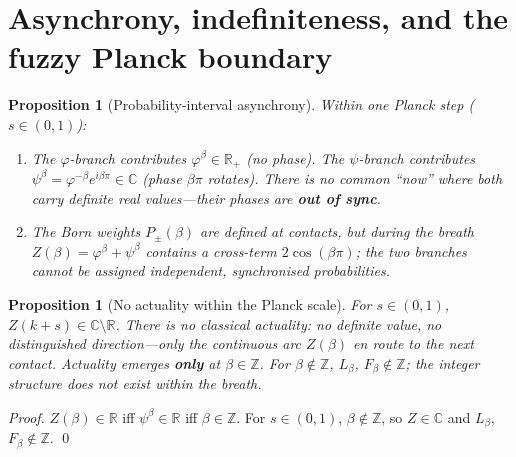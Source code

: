 \documentclass[12pt,a4paper]{article}
\newtheorem{proposition}[theorem]{Proposition}
\begin{document}
\section{Asynchrony, indefiniteness, and the fuzzy Planck boundary}
\label{sec:asynchrony}

\begin{proposition}[Probability-interval asynchrony]
\label{prop:prob-async}
Within one Planck step ($s \in (0,1)$):
\begin{enumerate}[nosep]
\item The $\varphi$-branch contributes $\varphi^\beta \in \mathbb{R}_+$ (no phase). The $\psi$-branch contributes $\psi^\beta = \varphi^{-\beta}e^{i\beta\pi} \in \mathbb{C}$ (phase $\beta\pi$ rotates). There is no common ``now'' where both carry definite real values---their phases are \textbf{out of sync}.
\item The Born weights $P_\pm(\beta)$ are defined at contacts, but during the breath $Z(\beta) = \varphi^\beta + \psi^\beta$ contains a cross-term $2\cos(\beta\pi)$; the two branches cannot be assigned independent, synchronised probabilities.
\end{enumerate}
\end{proposition}

\begin{proposition}[No actuality within the Planck scale]
\label{prop:no-actuality}
For $s \in (0,1)$, $Z(k{+}s) \in \mathbb{C} \setminus \mathbb{R}$. There is no classical actuality: no definite value, no distinguished direction---only the continuous arc $Z(\beta)$ en route to the next contact. Actuality emerges \textbf{only} at $\beta \in \mathbb{Z}$. For $\beta \notin \mathbb{Z}$, $L_\beta$, $F_\beta \notin \mathbb{Z}$; the integer structure does not exist within the breath.
\end{proposition}

\begin{proof}
$Z(\beta) \in \mathbb{R}$ iff $\psi^\beta \in \mathbb{R}$ iff $\beta \in \mathbb{Z}$. For $s \in (0,1)$, $\beta \notin \mathbb{Z}$, so $Z \in \mathbb{C}$ and $L_\beta$, $F_\beta \notin \mathbb{Z}$. \qed
\end{proof}
\end{document}
